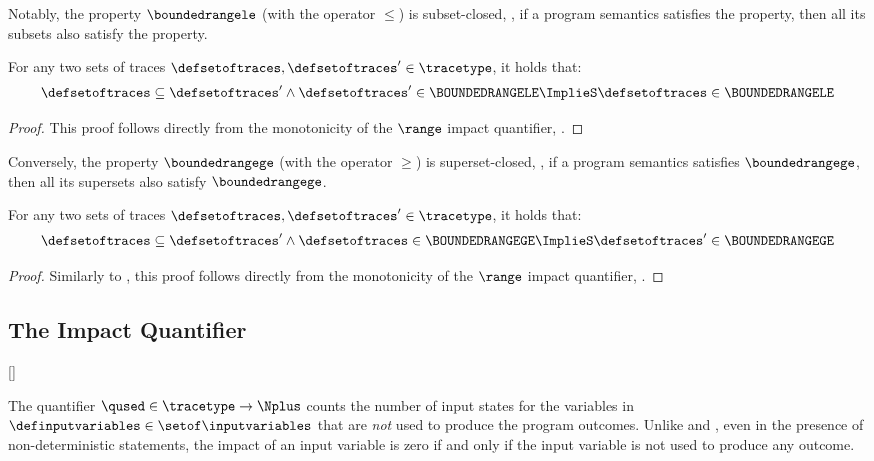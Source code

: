 Notably, the property $\boundedrangele$ (with the operator $\le$) is subset-closed, \ie, if a program semantics satisfies the property, then all its subsets also satisfy the property.

\begin{lemma}
  For any two sets of traces $\defsetoftraces, \defsetoftraces'\in\tracetype$, it holds that:
  \begin{gather*}
    \defsetoftraces \subseteq \defsetoftraces' \land \defsetoftraces' \in \BOUNDEDRANGELE \ImplieS \defsetoftraces \in \BOUNDEDRANGELE
  \end{gather*}
\end{lemma}
\begin{proof}
  This proof follows directly from the monotonicity of the $\range$ impact quantifier, \cf{} .
\end{proof}

Conversely, the property $\boundedrangege$ (with the operator $\ge$) is superset-closed, \ie, if a program semantics satisfies $\boundedrangege$, then all its supersets also satisfy $\boundedrangege$.

\begin{lemma}
  For any two sets of traces $\defsetoftraces, \defsetoftraces'\in\tracetype$, it holds that:
  \begin{gather*}
    \defsetoftraces \subseteq \defsetoftraces' \land \defsetoftraces \in \BOUNDEDRANGEGE \ImplieS \defsetoftraces' \in \BOUNDEDRANGEGE
  \end{gather*}
\end{lemma}
\begin{proof}
  Similarly to , this proof follows directly from the monotonicity of the $\range$ impact quantifier, \cf{} .
\end{proof}

\subsection{The \qusedname{} Impact Quantifier}[\qusedname]

The quantifier $\qused\in\tracetype\to\Nplus$ counts the number of input states for the variables in $\definputvariables\in\setof\inputvariables$ that are \emph{not} used to produce the program outcomes.
Unlike \outcomesname{} and \rangename{}, even in the presence of non-deterministic statements, the impact of an input variable is zero \wrt{} \qusedname{} if and only if the input variable is not used to produce any outcome.

